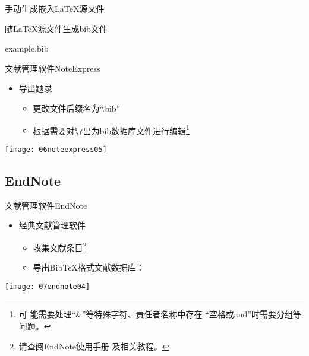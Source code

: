 \documentclass[fontset = none, t]{ctexbeamer}
\begin{document}
\begin{frame}[fragile]{手动生成}{嵌入\LaTeX 源文件}
\begin{spacing}{1.3}
\begin{center}
\begin{minipage}[h]{0.55\linewidth}
\begin{textcb}{随\LaTeX 源文件生成bib文件}
\begin{filecontents}{example.bib}
\begin{frame}[fragile]{文献管理软件}{NoteExpress}
  \begin{spacing}{1.2}
    \begin{itemize}
    \item 导出题录
      \begin{itemize}
      \item 更改文件后缀名为\enquote{.bib}
      \item 根据需要对导出为bib数据库文件进行编辑\footnote[frame,2]{可
          能需要处理\enquote{\&}等特殊字符、责任者名称中存在
          \enquote{空格或and}时需要分组等问题。}
      \end{itemize}
    \end{itemize}    
    \begin{center}
      \texttt{[image: 06noteexpress05]}
    \end{center}
  \end{spacing}
\end{frame}
\subsection[EndNote]{EndNote}
\begin{frame}[fragile]{文献管理软件}{EndNote}
  \begin{spacing}{1.5}
    \begin{itemize}
    \item 经典文献管理软件
      \begin{itemize}
      \item 收集文献条目\footnote[frame, 2]{请查阅EndNote使用手册
          及相关教程。}
      \item 导出Bib\TeX 格式文献数据库：
      \end{itemize}
    \end{itemize}    
    \begin{center}
      \texttt{[image: 07endnote04]}
    \end{center}
  \end{spacing}
\end{frame}


\end{filecontents}
\end{textcb}
\end{minipage}
\end{center}
\end{spacing}
\end{frame}
\end{document}
